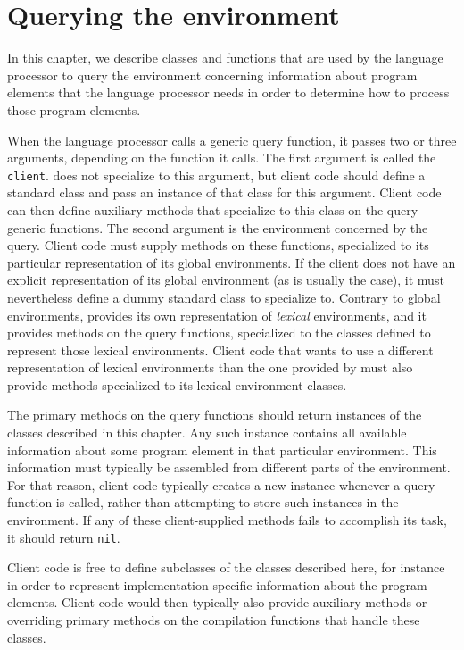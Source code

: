 \chapter{Querying the environment}

\label{chap-environment-querying}

In this chapter, we describe classes and functions that are used by
the language processor to query the environment concerning information about
program elements that the language processor needs in order to determine how to
process those program elements.

When the language processor calls a generic query function, it passes two or
three arguments, depending on the function it calls.  The first
argument is called the \texttt{client}.  \sysname{} does not
specialize to this argument, but client code should define a standard
class and pass an instance of that class for this argument.  Client
code can then define auxiliary methods that specialize to this class
on the query generic functions.  The second argument is the
environment concerned by the query.  Client code must supply methods
on these functions, specialized to its particular representation of
its global environments.  If the client does not have an explicit
representation of its global environment (as is usually the case), it
must nevertheless define a dummy standard class to specialize to.
Contrary to global environments, \sysname{} provides its own
representation of \emph{lexical} environments, and it provides methods
on the query functions, specialized to the classes defined to
represent those lexical environments.  Client code that wants
to use a different representation of lexical environments than the one
provided by \sysname{} must also provide methods specialized to its
lexical environment classes.

The primary methods on the query functions should return instances of
the classes described in this chapter.  Any such instance contains all
available information about some program element in that particular
environment.  This information must typically be assembled from
different parts of the environment.  For that reason, client code
typically creates a new instance whenever a query function is called,
rather than attempting to store such instances in the environment.  If
any of these client-supplied methods fails to accomplish its task, it
should return \texttt{nil}.

Client code is free to define subclasses of the classes described
here, for instance in order to represent implementation-specific
information about the program elements.  Client code would then
typically also provide auxiliary methods or overriding primary methods
on the compilation functions that handle these classes.

